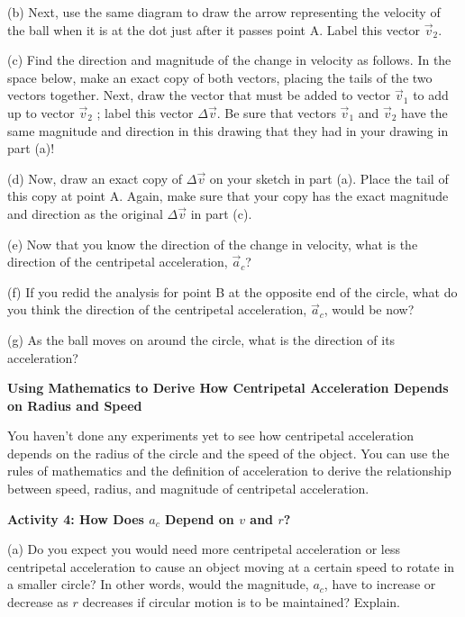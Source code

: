 (b) Next, use the same diagram to draw the arrow representing the velocity of
the ball when it is at the dot just after it passes point A. Label this vector
$\vec{v}_{2}$.

(c) Find the direction and magnitude of the change in velocity as follows. In
the space below, make an exact copy of both vectors, placing the tails of the
two vectors together. Next, draw the vector that must be added to vector $\vec{v}_{1}$
to add up to vector $\vec{v}_{2}$ ; label this vector \( \Delta  \)$\vec{v}$.
Be sure that vectors $\vec{v}_{1}$ and $\vec{v}_{2}$ have the
same magnitude and direction in this drawing that they had in your drawing in
part (a)!
\vspace{30mm}

(d) Now, draw an exact copy of \( \Delta  \)$\vec{v}$ on your sketch in part
(a). Place the tail of this copy at point A. Again, make sure that your copy
has the exact magnitude and direction as the original \( \Delta  \)$\vec{v}$
in part (c).
\vspace{20mm}

(e) Now that you know the direction of the change in velocity, what is the direction
of the centripetal acceleration, $\vec{a}_{c}$?
\vspace{20mm}

(f) If you redid the analysis for point B at the opposite end of the circle,
what do you think the direction of the centripetal acceleration, $\vec{a}_{c}$,
would be now?
\answerspace{20mm}

\pagebreak[2]
(g) As the ball moves on around the circle, what is the direction of its acceleration?
\answerspace{20mm}

\textbf{Using Mathematics to Derive How Centripetal Acceleration Depends on
Radius and Speed }

You haven't done any experiments yet to see how centripetal acceleration depends
on the radius of the circle and the speed of the object. You can use the rules
of mathematics and the definition of acceleration to derive the relationship
between speed, radius, and magnitude of centripetal acceleration. 

\textbf{Activity 4: How Does ${a_{c}}$ Depend on $v$ and $r$?} 

(a) Do you expect you would need more centripetal acceleration or less centripetal
acceleration to cause an object moving at a certain speed to rotate in a smaller
circle? In other words, would the magnitude, \( a_{c} \), have to increase
or decrease as $r$ decreases if circular motion is to be maintained? Explain.
\answerspace{20mm}

